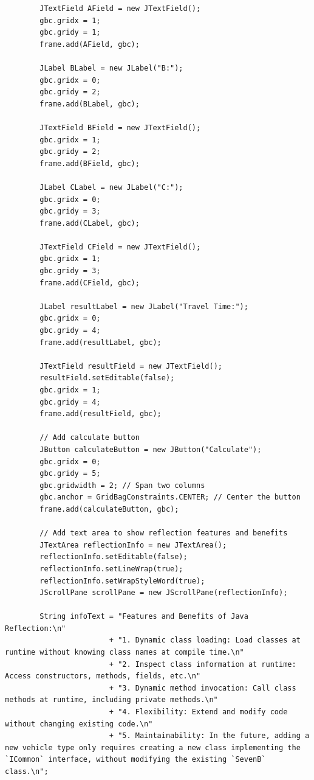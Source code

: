 \documentclass[12pt,a4paper]{article}
\begin{document}
\begin{lstlisting}
        JTextField AField = new JTextField();
        gbc.gridx = 1;
        gbc.gridy = 1;
        frame.add(AField, gbc);

        JLabel BLabel = new JLabel("B:");
        gbc.gridx = 0;
        gbc.gridy = 2;
        frame.add(BLabel, gbc);

        JTextField BField = new JTextField();
        gbc.gridx = 1;
        gbc.gridy = 2;
        frame.add(BField, gbc);

        JLabel CLabel = new JLabel("C:");
        gbc.gridx = 0;
        gbc.gridy = 3;
        frame.add(CLabel, gbc);

        JTextField CField = new JTextField();
        gbc.gridx = 1;
        gbc.gridy = 3;
        frame.add(CField, gbc);

        JLabel resultLabel = new JLabel("Travel Time:");
        gbc.gridx = 0;
        gbc.gridy = 4;
        frame.add(resultLabel, gbc);

        JTextField resultField = new JTextField();
        resultField.setEditable(false);
        gbc.gridx = 1;
        gbc.gridy = 4;
        frame.add(resultField, gbc);

        // Add calculate button
        JButton calculateButton = new JButton("Calculate");
        gbc.gridx = 0;
        gbc.gridy = 5;
        gbc.gridwidth = 2; // Span two columns
        gbc.anchor = GridBagConstraints.CENTER; // Center the button
        frame.add(calculateButton, gbc);

        // Add text area to show reflection features and benefits
        JTextArea reflectionInfo = new JTextArea();
        reflectionInfo.setEditable(false);
        reflectionInfo.setLineWrap(true);
        reflectionInfo.setWrapStyleWord(true);
        JScrollPane scrollPane = new JScrollPane(reflectionInfo);

        String infoText = "Features and Benefits of Java Reflection:\n"
                        + "1. Dynamic class loading: Load classes at runtime without knowing class names at compile time.\n"
                        + "2. Inspect class information at runtime: Access constructors, methods, fields, etc.\n"
                        + "3. Dynamic method invocation: Call class methods at runtime, including private methods.\n"
                        + "4. Flexibility: Extend and modify code without changing existing code.\n"
                        + "5. Maintainability: In the future, adding a new vehicle type only requires creating a new class implementing the `ICommon` interface, without modifying the existing `SevenB` class.\n";


\end{lstlisting}
\end{document}
